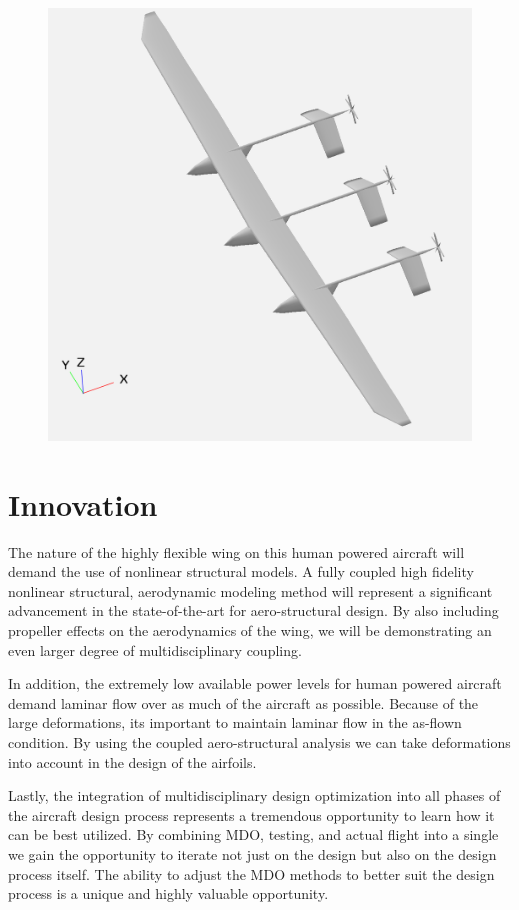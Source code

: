 \documentclass[]{aiaa-tc}
\begin{document}
    
    \begin{figure}
        \includegraphics[width=\textwidth]{images/vsp_concept_solid}
    \end{figure}

  \section{Innovation}
    The nature of the highly flexible wing on this human powered aircraft will demand the use 
    of nonlinear structural models. A fully coupled high fidelity nonlinear structural, aerodynamic modeling method 
    will represent a significant advancement in the state­-of-­the-­art for aero­-structural design. By also including 
    propeller effects on the aerodynamics of the wing, we will be demonstrating an even larger degree of multidisciplinary 
    coupling. 

    In addition, the extremely low available power levels for human powered aircraft demand laminar flow over as much of 
    the aircraft as possible. Because of the large deformations, its important to maintain laminar flow in the 
    as-flown condition. By using the coupled aero-structural analysis we can take deformations into account in the design 
    of the airfoils. 

    Lastly, the integration of multidisciplinary design optimization into all phases of the aircraft design process represents
    a tremendous opportunity to learn how it can be best utilized. By combining MDO, testing, and actual flight into a single 
    we gain the opportunity to iterate not just on the design but also on the design process itself. The ability to adjust the 
    MDO methods to better suit the design process is a unique and highly valuable opportunity. 
\end{document}
